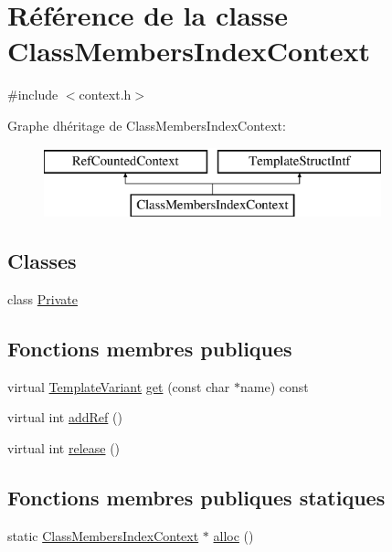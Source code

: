 \hypertarget{class_class_members_index_context}{}\section{Référence de la classe Class\+Members\+Index\+Context}
\label{class_class_members_index_context}


{\ttfamily \#include $<$context.\+h$>$}

Graphe d\textquotesingle{}héritage de Class\+Members\+Index\+Context\+:\begin{figure}[H]
\begin{center}
\leavevmode
\includegraphics[height=2.000000cm]{class_class_members_index_context}
\end{center}
\end{figure}
\subsection*{Classes}
\begin{DoxyCompactItemize}
\item 
class \hyperlink{class_class_members_index_context_1_1_private}{Private}
\end{DoxyCompactItemize}
\subsection*{Fonctions membres publiques}
\begin{DoxyCompactItemize}
\item 
virtual \hyperlink{class_template_variant}{Template\+Variant} \hyperlink{class_class_members_index_context_a2a74a487980891abdee2f7bf7cf009bf}{get} (const char $\ast$name) const 
\item 
virtual int \hyperlink{class_class_members_index_context_aee2107e3b581e26c374a76b102672a2e}{add\+Ref} ()
\item 
virtual int \hyperlink{class_class_members_index_context_a8605031254937e99bc7874e0715ea7f2}{release} ()
\end{DoxyCompactItemize}
\subsection*{Fonctions membres publiques statiques}
\begin{DoxyCompactItemize}
\item 
static \hyperlink{class_class_members_index_context}{Class\+Members\+Index\+Context} $\ast$ \hyperlink{class_class_members_index_context_af80e5590d7c947eb2f9c8ee0c1e1fdd9}{alloc} ()
\end{DoxyCompactItemize}


